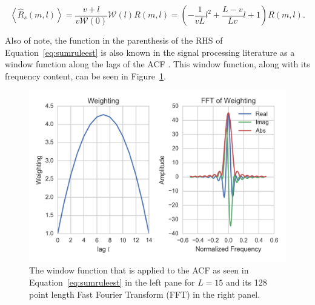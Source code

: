 \documentclass[draft,ras]{agutex}
\begin{document}
\begin{article}
\begin{equation}
\label{eq:sumruleest}
\left\langle\widehat{R}_s(m,l) \right\rangle  =\frac{v+l}{v\mathcal{W}(0)}\mathcal{W}(l)R(m,l) =\left(-\frac{1}{vL}l^2+\frac{L-v}{Lv}l+1\right)   R(m,l).
\end{equation}

\noindent Also of note, the function in the parenthesis of the RHS of Equation~\ref{eq:sumruleest} is also known in the signal processing literature as a window function along the lags of the ACF \citep{dtsp:openhiem}. This window function, along with its frequency content, can be seen in Figure~\ref{fig:isrwindow}.

\begin{figure}[!t]
\centering
\includegraphics[width=5in]{ISRWindow}
\caption{The window function that is applied to the ACF as seen in Equation~\ref{eq:sumruleest} in the left pane for $L=15$ and its 128 point length Fast Fourier Transform (FFT) in the right panel. }
\label{fig:isrwindow}
\end{figure}





\end{article}
\end{document}
